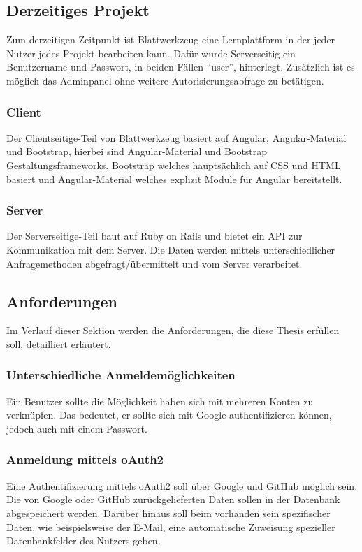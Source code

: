\documentclass[paper=a4,fontsize=12pt,parskip=half]{scrartcl}
\begin{document}
	\subsection{Derzeitiges Projekt}
	\label{sec: current_project}
	Zum derzeitigen Zeitpunkt ist Blattwerkzeug eine Lernplattform in der jeder Nutzer jedes Projekt bearbeiten kann. Dafür wurde Serverseitig ein Benutzername und Passwort, in beiden Fällen \enquote{user}, hinterlegt. Zusätzlich ist es möglich das Adminpanel ohne weitere Autorisierungsabfrage zu betätigen. 
	
	\subsubsection{Client}
	Der Clientseitige-Teil von Blattwerkzeug basiert auf Angular, Angular-Material und Bootstrap, hierbei sind Angular-Material und Bootstrap Gestaltungsframeworks. Bootstrap welches hauptsächlich auf \gls{CSS} und \gls{HTML} basiert und Angular-Material welches explizit Module für Angular bereitstellt. 
	
	\subsubsection{Server}
	Der Serverseitige-Teil baut auf Ruby on Rails und bietet ein \gls{API} zur Kommunikation mit dem Server. Die Daten werden mittels unterschiedlicher Anfragemethoden abgefragt/übermittelt und vom Server verarbeitet. 
	
	\subsection{Anforderungen}
	\label{sec: requirement}
	Im Verlauf dieser Sektion werden die Anforderungen, die diese Thesis erfüllen soll, detailliert erläutert.
	
	\subsubsection{Unterschiedliche Anmeldemöglichkeiten}
	Ein Benutzer sollte die Möglichkeit haben sich mit mehreren Konten zu verknüpfen. Das bedeutet, er sollte sich mit Google authentifizieren können, jedoch auch mit einem Passwort.
		
	\subsubsection{Anmeldung mittels \gls{oAuth2}}
	Eine Authentifizierung mittels oAuth2 soll über Google und GitHub möglich sein. Die von Google oder GitHub zurückgelieferten Daten sollen in der Datenbank abgespeichert werden. Darüber hinaus soll beim vorhanden sein spezifischer Daten, wie beispielsweise der E-Mail, eine automatische Zuweisung spezieller Datenbankfelder des Nutzers geben.
	
\end{document}
